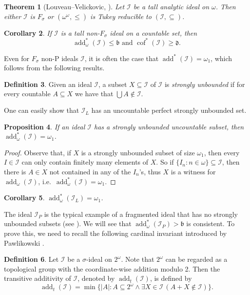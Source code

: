 \documentclass[a4paper,12pt]{amsart}
\newtheorem{thm}{Theorem}
\newtheorem{prop}[thm]{Proposition}
\newtheorem{cor}[thm]{Corollary}
\theoremstyle{definition}
\newtheorem{dfn}[thm]{Definition}
\numberwithin{thm}{section}
\numberwithin{equation}{section}
\newcommand{\bb}{\mathfrak{b}}
\newcommand{\dd}{\mathfrak{d}}
\DeclareMathOperator{\add}{add}
\DeclareMathOperator{\cof}{cof}
\newcommand{\I}{\mathscr{I}}
\renewcommand{\subset}{\subseteq}
\newcommand{\addo}[1]{\add_\omega(#1)}
\begin{document}
    \begin{thm}[Louveau--Velickovic, \cite{LV99}]\label{thm:Louveau-Velickovic}
        Let $\I$ be a tall analytic ideal on $\omega$. Then either $\I$ is $F_\sigma$ or $(\omega^\omega, \leq)$ is Tukey reducible to $(\mathcal{I}, \subset)$.
    \end{thm}

    \begin{cor}
        If $\I$ is a tall non-$F_\sigma$ ideal on a countable set, then
        \[
        \add^*_\omega(\I) \leq \bb \text{ and } \cof^*(\I)\geq\dd.
        \]
    \end{cor}

    Even for $F_\sigma$ non-P ideals $\I$, it is often the case that $\add^*(\I) = \omega_1$, which follows from the following results.

    \begin{dfn}
        Given an ideal $\I$, a subset $X \subset \I$ of $\I$ is \emph{strongly unbounded} if for every countable $A \subset X$ we have that $\bigcup A \notin \I$.
    \end{dfn}

    One can easily show that $\mathscr{I}_L$ has an uncountable perfect strongly unbounded set.
    
    \begin{prop}\label{prop:strongly_unbounded}
        If an ideal $\I$ has a strongly unbounded uncountable subset, then $\add^*_\omega(\I) = \omega_1$.
    \end{prop}
    \begin{proof}
        Observe that, if $X$ is a strongly unbounded subset of size $\omega_1$, then every $I \in \I$ can only contain finitely many elements of $X$. So if $\{I_n :n\in\omega\} \subset \I$, then there is $A \in X$ not contained in any of the $I_n$'s, thus $X$ is a witness for $\addo{\I}$, i.e.\ $\add^*_\omega(\I) = \omega_1$.
    \end{proof}

    \begin{cor}
        $\add^*_\omega(\I_L) = \omega_1$.
    \end{cor}
    
    The ideal $\I_P$ is the typical example of a fragmented ideal that has no strongly unbounded subsets (see \cite{HRRZ14}). We will see that $\add^*_\omega(\I_P) > \bb$ is consistent. To prove this, we need to recall the following cardinal invariant introduced by Pawlikowski \cite{Paw85}.

    \begin{dfn}
        Let $\mathcal{I}$ be a $\sigma$-ideal on $2^\omega$. Note that $2^\omega$ can be regarded as a topological group with the coordinate-wise addition modulo 2. Then the transitive additivity of $\mathcal{I}$, denoted by $\add_t(\mathcal{I})$, is defined by
        \[
        \add_t(\mathcal{I}) = \min\{\lvert A\rvert: A\subset 2^\omega\land \exists X\in\mathcal{I}\,(A + X\notin\mathcal{I})\}.
        \]
    \end{dfn}
\end{document}
